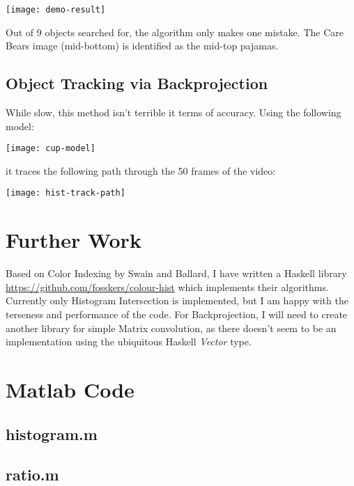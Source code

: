 \documentclass{article}
\begin{document}
\begin{center}
  \texttt{[image: demo-result]}
\end{center}

Out of 9 objects searched for, the algorithm only makes one mistake.
The Care Bears image (mid-bottom) is identified as the mid-top pajamas.

\subsection{Object Tracking via Backprojection}
While slow, this method isn't terrible it terms of accuracy.
Using the following model:

\begin{center}
  \texttt{[image: cup-model]}
\end{center}

it traces the following path through the 50 frames of the video:

\begin{center}
  \texttt{[image: hist-track-path]}
\end{center}

\section{Further Work}
Based on Color Indexing by Swain and Ballard, I have written a Haskell
library \url{https://github.com/fosskers/colour-hist} which implements their
algorithms. Currently only Histogram Intersection is implemented, but I am
happy with the terseness and performance of the code. For Backprojection,
I will need to create another library for simple Matrix convolution,
as there doesn't seem to be an implementation using the ubiquitous Haskell
\emph{Vector} type.

\section{Matlab Code}

\subsection{histogram.m}



\subsection{ratio.m}
\end{document}

